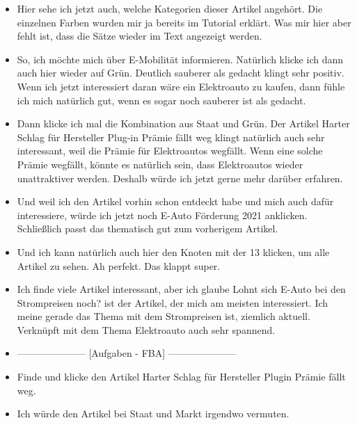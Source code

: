 {\begin{itemize}[]
            \item {} Hier sehe ich jetzt auch, welche Kategorien dieser Artikel angehört.
                  Die einzelnen Farben wurden mir ja bereits im Tutorial erklärt.
                  Was mir hier aber fehlt ist, dass die Sätze wieder im Text angezeigt werden.
            \item {} So, ich möchte mich über E-Mobilität informieren.
                  Natürlich klicke ich dann auch hier wieder auf Grün.
                  \flqq Deutlich sauberer als gedacht\frqq{} klingt sehr positiv.
                  Wenn ich jetzt interessiert daran wäre ein Elektroauto zu kaufen, dann fühle ich mich natürlich gut, wenn es sogar noch sauberer ist als gedacht.
            \item {} Dann klicke ich mal die Kombination aus Staat und Grün.
                  Der Artikel \flqq Harter Schlag für Hersteller Plug-in Prämie fällt weg\frqq{} klingt natürlich auch sehr interessant, weil die Prämie für Elektroautos wegfällt.
                  Wenn eine solche Prämie wegfällt, könnte es natürlich sein, dass Elektroautos wieder unattraktiver werden.
                  Deshalb würde ich jetzt gerne mehr darüber erfahren.
            \item {} Und weil ich den Artikel vorhin schon entdeckt habe und mich auch dafür interessiere, würde ich jetzt noch \flqq E-Auto Förderung 2021\frqq{} anklicken.
                  Schließlich passt das thematisch gut zum vorherigem Artikel.
            \item {} Und ich kann natürlich auch hier den Knoten mit der 13 klicken, um alle Artikel zu sehen.
                  Ah perfekt. Das klappt super.
            \item {} Ich finde viele Artikel interessant, aber ich glaube \flqq Lohnt sich E-Auto bei den Strompreisen noch?\frqq{} ist der Artikel, der mich am meisten interessiert.
                  Ich meine gerade das Thema mit dem Strompreisen ist, ziemlich aktuell.
                  Verknüpft mit dem Thema Elektroauto auch sehr spannend.
            \item {---------------------} [Aufgaben - FBA] {---------------------}
            \item {} Finde und klicke den Artikel \flqq Harter Schlag für Hersteller Plugin Prämie fällt weg\frqq{}.
            \item {} Ich würde den Artikel bei Staat und Markt irgendwo vermuten.

\end{itemize}}
